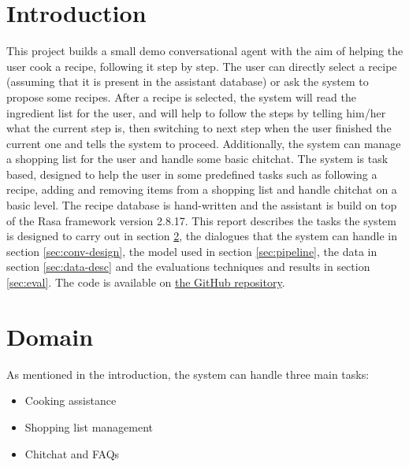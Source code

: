 \documentclass[journal, 11pt]{IEEEtran}
\begin{document}
\section{Introduction}
This project builds a small demo conversational agent with the aim of helping the user cook a recipe, following it step by step. The user can directly select a recipe (assuming that it is present in the assistant database) or ask the system to propose some recipes. After a recipe is selected, the system will read the ingredient list for the user, and will help to follow the steps by telling him/her what the current step is, then switching to next step when the user finished the current one and tells the system to proceed.
Additionally, the system can manage a shopping list for the user and handle some basic chitchat.
The system is task based, designed to help the user in some predefined tasks such as following a recipe, adding and removing items from a shopping list and handle chitchat on a basic level.
The recipe database is hand-written and the assistant is build on top of the Rasa framework \cite{rasaframework} version 2.8.17.
This report describes the tasks the system is designed to carry out in section \ref{sec:domain}, the dialogues that the system can handle in section \ref{sec:conv-design}, the model used in section \ref{sec:pipeline}, the data in section \ref{sec:data-desc} and the evaluations techniques and results in section \ref{sec:eval}.
The code is available on \href{https://github.com/andrearigo-dev/cooking-assistant-hmd}{the GitHub repository}.

\section{Domain}
\label{sec:domain}
As mentioned in the introduction, the system can handle three main tasks:
\begin{itemize}
    \item Cooking assistance
    \item Shopping list management
    \item Chitchat and FAQs
\end{itemize}
\end{document}

